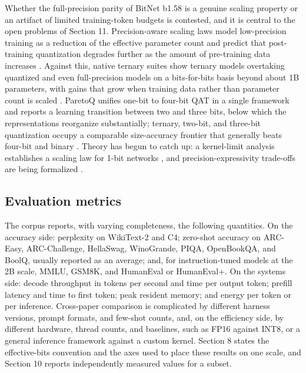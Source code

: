\documentclass[11pt]{article}
\begin{document}
Whether the full-precision parity of BitNet b1.58 is a genuine scaling property or an
artifact of limited training-token budgets is contested, and it is central to the open
problems of Section 11. Precision-aware scaling laws model low-precision training as a
reduction of the effective parameter count and predict that post-training quantization
degrades further as the amount of pre-training data increases
\cite{Kumar2024-ScalingLawsPrecision,Ouyang2024-QiDScaling}. Against this, native ternary
suites show ternary models overtaking quantized and even full-precision models on a
bits-for-bits basis beyond about 1B parameters, with gains that grow when training data
rather than parameter count is scaled \cite{Kaushal2024-Spectra,Vaidhya2025-Spectra11}.
ParetoQ unifies one-bit to four-bit QAT in a single framework and reports a learning
transition between two and three bits, below which the representations reorganize
substantially; ternary, two-bit, and three-bit quantization occupy a comparable
size-accuracy frontier that generally beats four-bit and binary \cite{Liu2025-ParetoQ}.
Theory has begun to catch up: a kernel-limit analysis establishes a scaling law for
1-bit networks \cite{Daliri2024-Theory1bit}, and precision-expressivity trade-offs are being
formalized \cite{Anon2026-EveryBitCounts,Anon2026-ExpressivePowerWQ}.

\subsection{Evaluation metrics}

The corpus reports, with varying completeness, the following quantities. On the accuracy
side: perplexity on WikiText-2 and C4; zero-shot accuracy on ARC-Easy, ARC-Challenge,
HellaSwag, WinoGrande, PIQA, OpenBookQA, and BoolQ, usually reported as an average; and,
for instruction-tuned models at the 2B scale, MMLU, GSM8K, and HumanEval or HumanEval+.
On the systems side: decode throughput in tokens per second and time per output token;
prefill latency and time to first token; peak resident memory; and energy per token or
per inference. Cross-paper comparison is complicated by different harness versions,
prompt formats, and few-shot counts, and, on the efficiency side, by different
hardware, thread counts, and baselines, such as FP16 against INT8, or a general
inference framework against a custom kernel. Section 8 states the effective-bits
convention and the axes used to place these results on one scale, and Section 10
reports independently measured values for a subset.
\end{document}
